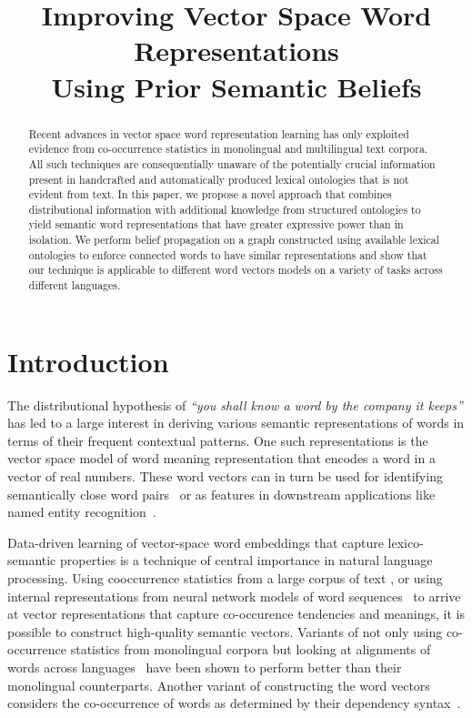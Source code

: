 \documentclass[11pt]{article}
\title{Improving Vector Space Word Representations\\
Using Prior Semantic Beliefs}
\begin{document}
\maketitle
\begin{abstract}
  Recent advances in vector space word representation learning has
  only exploited evidence from co-occurrence statistics in
  monolingual and multilingual text corpora. All such techniques are 
  consequentially unaware of the
  potentially crucial information present in handcrafted and automatically
  produced lexical ontologies that is not evident from text. In this 
  paper, we propose a novel approach that combines distributional 
  information with additional knowledge from structured ontologies to 
  yield semantic word representations that have greater expressive power 
  than in isolation. We perform belief propagation on a graph constructed
  using available lexical ontologies to enforce connected words to
  have similar representations and show that our technique is applicable to
  different word vectors models on a variety of tasks across different languages.
\end{abstract}

\section{Introduction}

The distributional hypothesis of  \emph{``you shall know a word by the
company it keeps''} has led to a large interest in deriving various semantic representations
of words in terms of their frequent contextual patterns. One such representations is the vector
space model of word meaning representation that encodes a word in a vector of real numbers.
These word vectors can in turn be used for identifying semantically close word 
pairs~\cite{Turney:2006:SSR:1174520.1174523,Agirre:2009:SSR:1620754.1620758} or as features
in downstream applications like named entity recognition~\cite{turian:2010}.

Data-driven learning of vector-space word embeddings that capture lexico-semantic 
properties is a technique of central importance in natural language processing. 
Using cooccurrence statistics from a large corpus of text 
\cite{deerwester-90}, or using internal representations from neural 
network models of word sequences~\cite{Collobert:2008:UAN:1390156.1390177} to 
arrive at vector representations that capture co-occurence tendencies and meanings,
it is possible to construct high-quality semantic vectors.
Variants of not only using co-occurrence statistics from monolingual corpora but looking
at alignments of words across languages~\cite{zou-EtAl:2013:EMNLP,hermann2014multilingual,faruqui-dyer:2014:EACL2014}
have been shown to perform better than their monolingual counterparts. Another variant of
constructing the word vectors considers the co-occurrence of words as determined by their
dependency syntax~\cite{Pado:2007:DCS:1268656.1268658}. 
\end{document}

